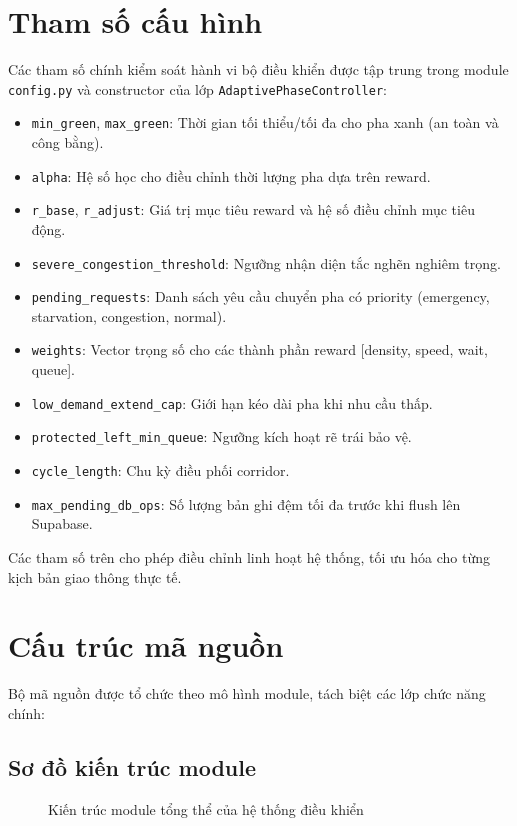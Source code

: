 \section{Tham số cấu hình}

Các tham số chính kiểm soát hành vi bộ điều khiển được tập trung trong module \texttt{config.py} và constructor của lớp \texttt{AdaptivePhaseController}:

\begin{itemize}
    \item \texttt{min\_green}, \texttt{max\_green}: Thời gian tối thiểu/tối đa cho pha xanh (an toàn và công bằng).
    \item \texttt{alpha}: Hệ số học cho điều chỉnh thời lượng pha dựa trên reward.
    \item \texttt{r\_base}, \texttt{r\_adjust}: Giá trị mục tiêu reward và hệ số điều chỉnh mục tiêu động.
    \item \texttt{severe\_congestion\_threshold}: Ngưỡng nhận diện tắc nghẽn nghiêm trọng.
    \item \texttt{pending\_requests}: Danh sách yêu cầu chuyển pha có priority (emergency, starvation, congestion, normal).
    \item \texttt{weights}: Vector trọng số cho các thành phần reward [density, speed, wait, queue].
    \item \texttt{low\_demand\_extend\_cap}: Giới hạn kéo dài pha khi nhu cầu thấp.
    \item \texttt{protected\_left\_min\_queue}: Ngưỡng kích hoạt rẽ trái bảo vệ.
    \item \texttt{cycle\_length}: Chu kỳ điều phối corridor.
    \item \texttt{max\_pending\_db\_ops}: Số lượng bản ghi đệm tối đa trước khi flush lên Supabase.
\end{itemize}

Các tham số trên cho phép điều chỉnh linh hoạt hệ thống, tối ưu hóa cho từng kịch bản giao thông thực tế.

\section{Cấu trúc mã nguồn}

Bộ mã nguồn được tổ chức theo mô hình module, tách biệt các lớp chức năng chính:

\subsection{Sơ đồ kiến trúc module}
\begin{figure}[H]
    \centering
    \caption{Kiến trúc module tổng thể của hệ thống điều khiển}
    \label{fig:impl_architecture}
\end{figure}

